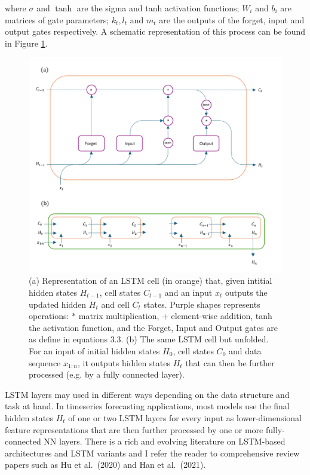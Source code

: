 \documentclass[11pt,a4paper,twoside,openright]{report}
\theoremstyle{definition}
\begin{document}
where \(\sigma\) and \(\tanh\) are the sigma and tanh activation functions; \(W_i\) and \(b_i\) are matrices of gate parameters; \(k_t,l_t\) and \(m_t\) are the outputs of the forget, input and output gates respectively. A schematic representation of this process can be found in Figure \ref{fig:lstm}.

\begin{figure}[h]

{\centering \includegraphics[width=0.8\linewidth]{images/lstm_fig} 

}

\caption{(a) Representation of an LSTM cell (in orange) that, given intitial hidden states $H_{t-1}$, cell states $C_{t-1}$ and an input $x_t$ outputs the updated hidden $H_{t}$ and cell $C_{t}$ states. Purple shapes represents operations: $\ast$ matrix multiplication, $+$ element-wise addition, tanh the activation function, and the Forget, Input and Output gates are as define in equations 3.3. (b) The same LSTM cell but unfolded. For an input of initial hidden states $H_{0}$, cell states $C_{0}$ and data sequence $x_{1:n}$, it outputs hidden states $H_t$ that can then be further processed (e.g. by a fully connected layer).}\label{fig:lstm}
\end{figure}

LSTM layers may used in different ways depending on the data structure and task at hand. In timeseries forecasting applications, most models use the final hidden states \(H_t\) of one or two LSTM layers for every input as lower-dimensional feature representations that are then further processed by one or more fully-connected NN layers. There is a rich and evolving literature on LSTM-based architectures and LSTM variants and I refer the reader to comprehensive review papers such as Hu et al.~(2020) and Han et al.~(2021).
\end{document}
